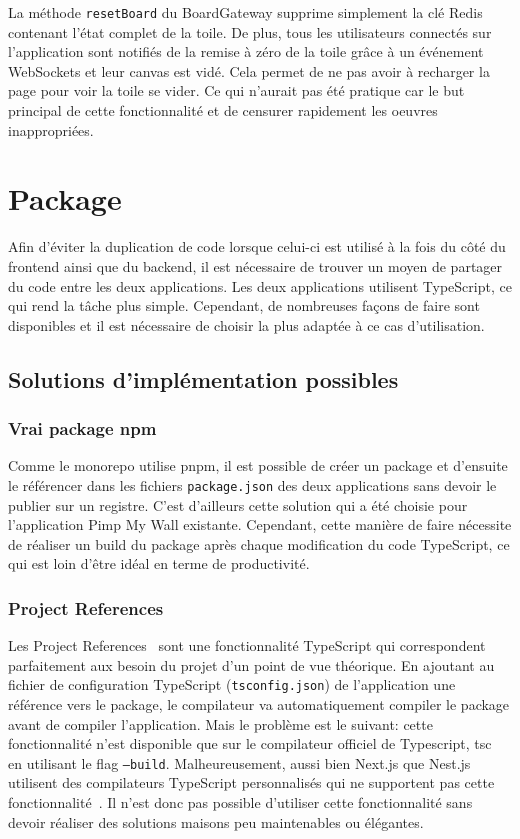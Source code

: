 La méthode \texttt{resetBoard} du BoardGateway supprime simplement la clé Redis contenant l'état complet de la toile. De plus, tous les utilisateurs connectés sur l'application sont notifiés de la remise à zéro de la toile grâce à un événement WebSockets et leur canvas est vidé. Cela permet de ne pas avoir à recharger la page pour voir la toile se vider. Ce qui n'aurait pas été pratique car le but principal de cette fonctionnalité et de censurer rapidement les oeuvres inappropriées.

\section{Package}

Afin d'éviter la duplication de code lorsque celui-ci est utilisé à la fois du côté du frontend ainsi que du backend, il est nécessaire de trouver un moyen de partager du code entre les deux applications. Les deux applications utilisent TypeScript, ce qui rend la tâche plus simple. Cependant, de nombreuses façons de faire sont disponibles et il est nécessaire de choisir la plus adaptée à ce cas d'utilisation.

\subsection{Solutions d'implémentation possibles}

\subsubsection{Vrai package npm}

Comme le monorepo utilise \gls{pnpm}, il est possible de créer un package et d'ensuite le référencer dans les fichiers \texttt{package.json} des deux applications sans devoir le publier sur un registre. C'est d'ailleurs cette solution qui a été choisie pour l'application Pimp My Wall existante. Cependant, cette manière de faire nécessite de réaliser un build du package après chaque modification du code TypeScript, ce qui est loin d'être idéal en terme de productivité.

\subsubsection{Project References}

Les Project References~\cite{project-references} sont une fonctionnalité TypeScript qui correspondent parfaitement aux besoin du projet d'un point de vue théorique. En ajoutant au fichier de configuration TypeScript (\texttt{tsconfig.json}) de l'application une référence vers le package, le compilateur va automatiquement compiler le package avant de compiler l'application. Mais le problème est le suivant: cette fonctionnalité n'est disponible que sur le compilateur officiel de Typescript, tsc~\cite{tsc} en utilisant le flag \texttt{--build}. Malheureusement, aussi bien Next.js que Nest.js utilisent des compilateurs TypeScript personnalisés qui ne supportent pas cette fonctionnalité~\cite{nest-tsc-build-option}. Il n'est donc pas possible d'utiliser cette fonctionnalité sans devoir réaliser des solutions maisons peu maintenables ou élégantes.


